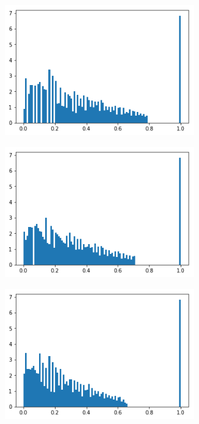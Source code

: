 \documentclass[10pt, a4paper]{article}
\begin{document}
\begin{figure}[H]	
	\centering
    \begin{subfigure}{0.3\textwidth}
        \includegraphics[width=0.9\textwidth]{patitos-histogramaFinal-k2.png}
    \end{subfigure}\hfill
    	\centering
    \begin{subfigure}{0.3\textwidth}
        \includegraphics[width=0.9\textwidth]{patitos-histogramaFinal-k4.png}
    \end{subfigure}\hfill	
    \centering
    \begin{subfigure}{0.3\textwidth}
        \includegraphics[width=0.9\textwidth]{patitos-histogramaFinal-k16.png}

\end{subfigure}
\end{figure}
\end{document}
